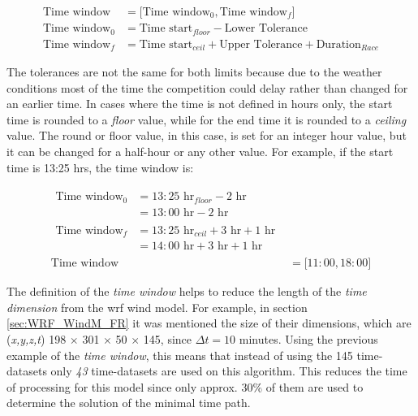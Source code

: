 \begin{align} %
    \textrm{Time window} &=\big[\textrm{Time window}_{0},  \textrm{Time window}_{f} \big]\label{eq:time_window}\\
    \textrm{Time window}_{0}&=\textrm{Time start}_{floor}-\textrm{Lower Tolerance} \label{eq:time_window0}\\
    \textrm{Time window}_{f}&=\textrm{Time start}_{ceil}+\textrm{Upper Tolerance}+\textrm{Duration}_{Race} \label{eq:time_windowf}
\end{align}
\par
The tolerances are not the same for both limits because due to the weather conditions most of the time the competition could delay rather than changed for an earlier time. In cases where the time is not defined in hours only, the start time is rounded to a \textit{floor} value, while for the end time it is rounded to a \textit{ceiling} value. The round or floor value, in this case, is set for an integer hour value, but it can be changed for a half-hour or any other value. For example, if the start time is 13:25 hrs, the time window is:\par
\begin{align} %
   \begin{split}
        \textrm{Time window}_{0}&= 13:25\textrm{ hr}_{floor} -\textrm{2 hr}\\ 
        &= 13:00\textrm{ hr} - 2\textrm{ hr}
   \end{split} \label{eq:time_window0Ex}\\
    \begin{split}
        \textrm{Time window}_{f}&=13:25\textrm{ hr}_{ceil}+\textrm{3 hr}+\textrm{1 hr}\\
        &= 14:00 \textrm{ hr} + 3\textrm{ hr} +1 \textrm{ hr} \label{eq:time_windowfEx}
    \end{split}
    \\
    \textrm{Time window} &= \big[11:00,18:00 \big]
\end{align}
\par
The definition of the \textit{time window} helps to reduce the length of the \textit{time dimension} from the \acrshort{wrf} wind model. For example, in section  \ref{sec:WRF_WindM_FR} it was mentioned the size of their dimensions, which are (\textit{x,y,z,t}) 198 $\times$ 301 $\times$ 50 $\times$ 145, since $\Delta t = 10$ minutes. Using the previous example of the \textit{time window}, this means that instead of using the 145 time-datasets only \textit{43} time-datasets are used on this algorithm. This reduces the time of processing for this model since only approx. $30\%$ of them are used to determine the solution of the minimal time path.\par 

